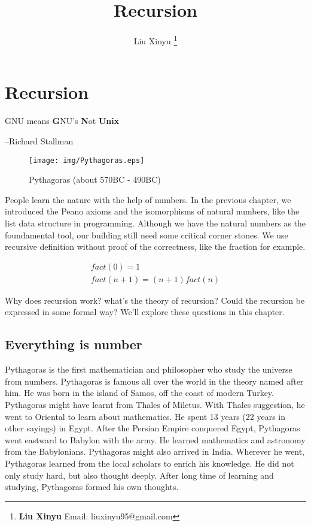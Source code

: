 \documentclass{article}
\begin{document}
\title{Recursion}

\author{Liu Xinyu
\thanks{{\bfseries Liu Xinyu} \newline
  Email: liuxinyu95@gmail.com}}

\maketitle
\fi


\ifx\wholebook\relax
\chapter{Recursion}
\fi

\epigraph{GNU means \textbf{G}NU's \textbf{N}ot \textbf{Unix}}{--Richard Stallman}

\begin{wrapfigure}{R}{0.3\textwidth}
 \centering
 \texttt{[image: img/Pythagoras.eps]}
 \captionsetup{labelformat=empty}
 \caption{Pythagoras (about 570BC - 490BC)}
 \label{fig:Pythagoras}
\end{wrapfigure}

People learn the nature with the help of numbers. In the previous chapter, we introduced the Peano axioms and the isomorphisms of natural numbers, like the list data structure in programming. Although we have the natural numbers as the foundamental tool, our building still need some critical corner stones. We use recursive definition without proof of the correctness, like the fraction for example.

\[
\begin{array}{l}
fact(0) = 1 \\
fact(n + 1) = (n + 1) fact(n)
\end{array}
\]

Why does recursion work? what's the theory of recursion? Could the recursion be expressed in some formal way? We'll explore these questions in this chapter.

\section{Everything is number}

Pythagoras is the first mathematician and philosopher who study the universe from numbers. Pythagoras is famous all over the world in the theory named after him. He was born in the island of Samos, off the coast of modern Turkey. Pythagoras might have learnt from Thales of Miletus. With Thales suggestion, he went to Oriental to learn about mathematics. He spent 13 years (22 years in other sayings) in Egypt. After the Persian Empire conquered Egypt, Pythagoras went eastward to Babylon with the army. He learned mathematics and astronomy from the Babylonians. Pythagoras might also arrived in India. Wherever he went, Pythagoras learned from the local scholars to enrich his knowledge. He did not only study hard, but also thought deeply. After long time of learning and studying, Pythagoras formed his own thoughts\cite{HanXueTao16}.
\end{document}

